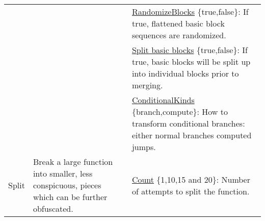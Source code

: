 \begin{table*}[p]
\begin{tabular}{|p{2.25cm}|p{4cm}|p{11cm}|}
                                     &                                                                                                                                                                                                                                                                                                         & \underline{RandomizeBlocks} \{true,false\}: If true, flattened basic block sequences are randomized.                                                                                                                                                                                                                                                                 \\ \cline{3-3} 
                                     &                                                                                                                                                                                                                                                                                                         & \underline{Split basic blocks} \{true,false\}: If true, basic blocks will be split up into individual blocks prior to merging.                                                                                                                                                                                                                                 \\ \cline{3-3} 
                                     &                                                                                                                                                                                                                                                                                                         & \underline{ConditionalKinds} \{branch,compute\}: How to transform conditional branches: either normal branches computed jumps.                                                                                                                                                                                                          \\ \hline
\multirow{2}{*}{Split}               & \multirow{2}{4cm}{Break a large function into smaller, less conspicuous, pieces which can be further obfuscated. }                                                                                                                                                                                                           & \underline{Count} \{1,10,15 and 20\}: Number of attempts to split the function.                                                                                                                                                                                                                                                                   \\ \cline{3-3} 

\end{tabular}
\end{table*}
